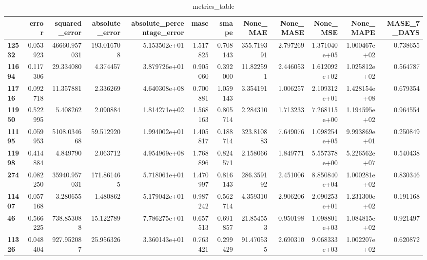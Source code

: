 \begin{table}[h]
\centering
\caption{metrics_table}
\label{table:Final tuning for dataset 2 local multivariate.}
\begin{tabular}{lrrrrrrrrrrr}
\toprule
{} &     error &  squared\_error &  absolute\_error &  absolute\_percentage\_error &      mase &     smape &     None\_MAE &  None\_MASE &      None\_MSE &     None\_MAPE &  MASE\_7\_DAYS \\
\midrule
\textbf{12532} &  0.053923 &   46660.957031 &      193.016708 &               5.153502e+01 &  1.517825 &  0.708143 &   355.719391 &   2.797269 &  1.371040e+05 &  1.000467e+02 &     0.738655 \\
\textbf{11694} &  0.117306 &      29.334080 &        4.374457 &               3.879726e+01 &  0.905060 &  0.392000 &    11.822591 &   2.446053 &  1.612092e+02 &  1.025812e+02 &     0.564787 \\
\textbf{11716} &  0.092718 &      11.357881 &        2.336269 &               4.640308e+08 &  0.700881 &  1.059143 &     3.354191 &   1.006257 &  2.109312e+01 &  1.428154e+08 &     0.679354 \\
\textbf{11950} &  0.522995 &       5.408262 &        2.090884 &               1.814271e+02 &  1.568163 &  0.805714 &     2.284310 &   1.713233 &  7.268115e+00 &  1.194595e+02 &     0.964554 \\
\textbf{11195} &  0.059953 &    5108.034668 &       59.512920 &               1.994002e+01 &  1.405817 &  0.188714 &   323.810883 &   7.649076 &  1.098254e+05 &  9.993869e+01 &     0.250849 \\
\textbf{11998} &  0.414884 &       4.849790 &        2.063712 &               4.954969e+08 &  1.768896 &  0.824571 &     2.158066 &   1.849771 &  5.557378e+00 &  5.226562e+07 &     0.540438 \\
\textbf{274  } &  0.082250 &   35940.957031 &      171.861465 &               5.718061e+01 &  1.470997 &  0.816143 &   286.359192 &   2.451006 &  8.850840e+04 &  1.000281e+02 &     0.830346 \\
\textbf{11407} &  0.057168 &       3.280655 &        1.480862 &               5.179042e+01 &  0.987242 &  0.562714 &     4.359310 &   2.906206 &  2.090253e+01 &  1.231300e+02 &     0.191168 \\
\textbf{46   } &  0.566225 &     738.853088 &       15.122789 &               7.786275e+01 &  0.657513 &  0.691857 &    21.854553 &   0.950198 &  1.098801e+03 &  1.084815e+02 &     0.921497 \\
\textbf{11326} &  0.048404 &     927.952087 &       25.956326 &               3.360143e+01 &  0.763421 &  0.299429 &    91.470535 &   2.690310 &  9.068333e+03 &  1.002207e+02 &     0.620872 \\

\end{tabular}
\end{table}
